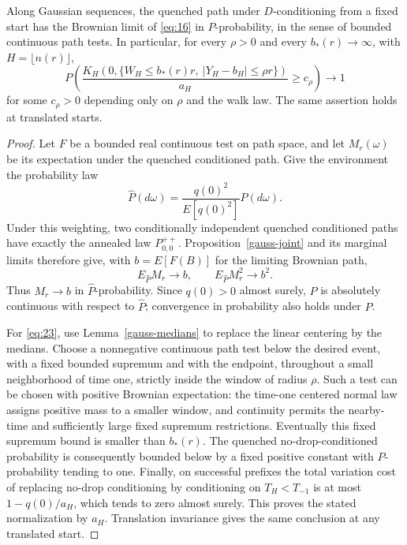 \begin{corollary}\label{gauss-quenched}
Along Gaussian sequences, the quenched path under \(D\)-conditioning
from a fixed start has the Brownian limit of \eqref{eq:16} in
\(P\)-probability, in the sense of bounded continuous path tests.
In particular, for every \(\rho>0\) and every \(b_*(r)\to\infty\),
with \(H=\lfloor n(r)\rfloor\),
\[
P\left(\frac{K_H(0,\{ W_H\le b_*(r)r,\ |Y_H-b_H|\le\rho r\})}{a_H}
\ge c_\rho\right)\longrightarrow1
\tag{23}\label{eq:23}
\]
for some \(c_\rho>0\) depending only on \(\rho\) and the walk law.
The same assertion holds at translated starts.
\end{corollary}

\begin{proof}
Let \(F\) be a bounded real continuous test on path space, and let
\(M_r(\omega)\) be its expectation under the quenched conditioned
path. Give the environment the probability law
\[
\widehat P(d\omega)=\frac{q(0)^2}{E[q(0)^2]}P(d\omega).
\]
Under this weighting, two conditionally independent quenched
conditioned paths have exactly the annealed law \(P_{0,0}^{++}\).
Proposition~\ref{gauss-joint} and its marginal limits therefore give,
with \(b=E[F(B)]\) for the limiting Brownian path,
\[
E_{\widehat P}M_r\longrightarrow b,
\qquad E_{\widehat P}M_r^2\longrightarrow b^2.
\]
Thus \(M_r\to b\) in \(\widehat P\)-probability. Since
\(q(0)>0\) almost surely, \(P\) is absolutely continuous with respect to
\(\widehat P\); convergence in probability also holds under \(P\).

For \eqref{eq:23}, use Lemma~\ref{gauss-medians} to replace the
linear centering by the medians. Choose a nonnegative continuous
path test below the desired event, with a fixed bounded supremum and
with the endpoint, throughout a small neighborhood of time one,
strictly inside the window of radius \(\rho\). Such a test can be
chosen with positive Brownian expectation: the time-one centered normal
law assigns positive mass to a smaller window, and continuity permits
the nearby-time and sufficiently large fixed supremum restrictions.
Eventually this fixed supremum bound is smaller than \(b_*(r)\).
The quenched no-drop-conditioned probability is consequently bounded
below by a fixed positive constant with \(P\)-probability tending to one.
Finally, on successful prefixes the total variation cost of replacing
no-drop conditioning by conditioning on \(T_H<T_{-1}\) is at most
\(1-q(0)/a_H\), which tends to zero almost surely. This proves the
stated normalization by \(a_H\). Translation invariance gives the
same conclusion at any translated start.
\end{proof}
